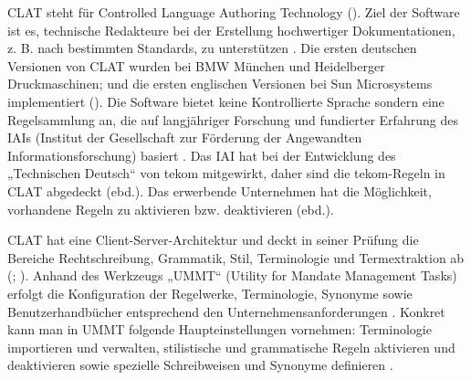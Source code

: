 CLAT steht für Controlled Language Authoring Technology (\citealt{HallerSchütz2001}). Ziel der Software ist es, technische Redakteure bei der Erstellung hochwertiger Dokumentationen, z. B. nach bestimmten Standards, zu unterstützen \citep{Rösener2010}. Die ersten deutschen Versionen von CLAT wurden bei BMW München und Heidelberger Druckmaschinen; und die ersten englischen Versionen bei Sun Microsystems implementiert (\citealt{HallerSchütz2001}). Die Software bietet keine Kontrollierte Sprache sondern eine Regelsammlung an, die auf langjähriger Forschung und fundierter Erfahrung des IAIs (Institut der Gesellschaft zur Förderung der Angewandten Informationsforschung) basiert \citep{Geldbach2009}. Das IAI hat bei der Entwicklung des „Technischen Deutsch“ von tekom mitgewirkt, daher sind die tekom-Regeln in CLAT abgedeckt (ebd.). Das erwerbende Unternehmen hat die Möglichkeit, vorhandene Regeln zu aktivieren bzw. deaktivieren (ebd.).

CLAT hat eine Client-Server-Architektur und deckt in seiner Prüfung die Bereiche Rechtschreibung, Grammatik, Stil, Terminologie und Termextraktion ab (\citealt{Geldbach2009}; \citealt{Rösener2010}). Anhand des Werkzeugs „UMMT“ (Utility for Mandate Management Tasks) erfolgt die Konfiguration der Regelwerke, Terminologie, Synonyme sowie Benutzerhandbücher entsprechend den Unternehmensanforderungen \citep{Geldbach2009}. Konkret kann man in UMMT folgende Haupteinstellungen vornehmen: Terminologie importieren und verwalten, stilistische und grammatische Regeln aktivieren und deaktivieren sowie spezielle Schreibweisen und Synonyme definieren \citep{Rösener2010}.

